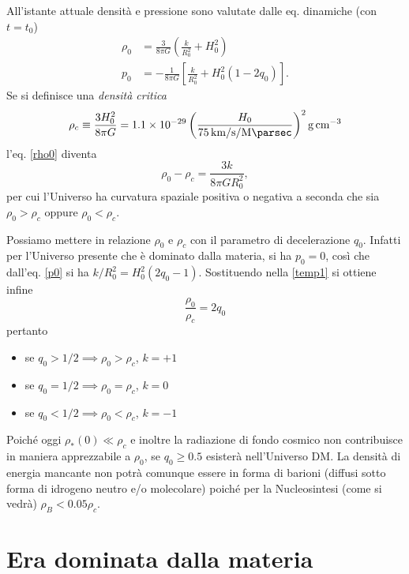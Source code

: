 All'istante attuale densità e pressione sono valutate dalle eq. dinamiche (con $t=t_0$)
\begin{subequations}
  \begin{align}
    \label{rho0}
    \rho_0  &= \frac{3}{8 \pi G} \left(\frac{k}{R_0^2} + H_0^2 \right) \\
    \label{p0}
    p_0 &= -\frac{1}{8 \pi G} \left[\frac {k}{R_0^2}+H_0^2(1-2q_0)\right].
  \end{align}
\end{subequations}
Se si definisce una \emph{densità critica}
\begin{equation}
  \rho_c \equiv  \frac{3 H_0^2}{8 \pi G} = 1.1 \times 10^{-29}
  \left(
    \frac{H_0}{\SI[per-mode=reciprocal]{75}{\kilo\metre \per \second \per
        \mega\parsec}}
  \right)^2
  \si{\gram\per\centi\metre\cubed}
  \label{rhoc}
\end{equation}
l'eq. \eqref{rho0} diventa
\begin{equation}
  \rho_0-\rho_c =  \frac{3 k}{8 \pi G R_0^2},
  \label{temp1}
\end{equation}
per cui l'Universo ha curvatura spaziale positiva o negativa a seconda che sia
$\rho_0 > \rho_c$ oppure $\rho_0 < \rho_c$.

Possiamo mettere in relazione $\rho_0$ e $\rho_c$ con il parametro di
decelerazione $q_0$.  Infatti per l'Universo presente che è dominato dalla
materia, si ha $p_0=0$, così che dall'eq.  \eqref{p0} si ha $k/R_0^2 = H_0^2
(2q_0-1)$.  Sostituendo nella \eqref{temp1} si ottiene infine
\begin{equation}
  \frac {\rho_0} {\rho_c}=2 q_0
  \label{rho0surhoc}
\end{equation}
pertanto
\begin{itemize}
\item se $q_0 > 1/2 \implies \rho_0>\rho_c$, $k=+1$
\item se $q_0 = 1/2 \implies \rho_0=\rho_c$, $k=0$
\item se $q_0 < 1/2 \implies \rho_0<\rho_c$, $k=-1$
\end{itemize}

Poiché oggi $\rho_*(0) \ll \rho_c$ e inoltre la radiazione di fondo cosmico non
contribuisce in maniera apprezzabile a $\rho_0$, se $q_0 \ge 0.5$ esisterà
nell'Universo DM.  La densità di energia mancante non potrà comunque essere in
forma di barioni (diffusi sotto forma di idrogeno neutro e/o molecolare) poiché
per la Nucleosintesi (come si vedrà) $\rho_B < 0.05 \rho_c$.

\section{Era dominata dalla materia}

